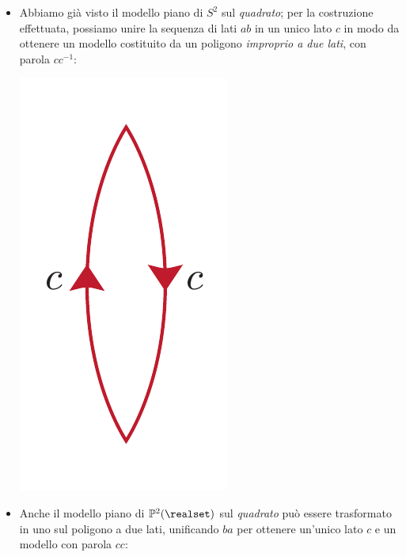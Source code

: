 \begin{examples}
	\begin{itemize}
		\item Abbiamo già visto il modello piano di $S^2$ sul \textit{quadrato}; per la costruzione effettuata, possiamo unire la sequenza di lati $ab$ in un unico lato $c$ in modo da ottenere un modello costituito da un poligono \textit{improprio a due lati}, con parola $cc^{-1}$:
		\begin{center}
			\includegraphics[trim=0cm 0cm 0cm 0cm, clip, scale=0.375]{images/sphere2lines.pdf}
		\end{center}
		\item Anche il modello piano di $\mathbb{P}^2(\realset)$ sul \textit{quadrato} può essere trasformato in uno sul poligono a due lati, unificando $ba$ per ottenere un'unico lato $c$ e un modello con parola $cc$:
		\begin{center}

\end{center}
\end{itemize}
\end{examples}
